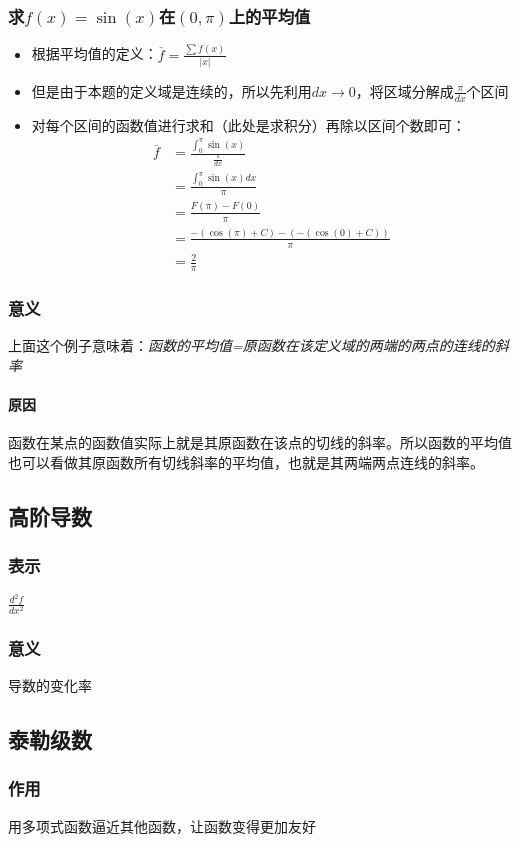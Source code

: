 \documentclass[UTF8]{ctexart}
\begin{document}
\subsubsection{求$f(x) = \sin(x)$在$(0,\pi)$上的平均值}
\begin{itemize}
	\item 根据平均值的定义：$\overline{f} = \frac{\sum f(x)}{|x|}$
	\item 但是由于本题的定义域是连续的，所以先利用$dx\to0$，将区域分解成$\frac{\pi}{dx}$个区间
	\item 对每个区间的函数值进行求和（此处是求积分）再除以区间个数即可：\begin{align*}
		\overline{f} &= \frac{\int_0^{\pi} \sin(x)}{\frac{\pi}{dx}} \\
		&= \frac{\int_0^{\pi} \sin(x)dx}{\pi} \\
		&= \frac{F(\pi) - F(0)}{\pi} \\
		&= \frac{-(\cos(\pi)+C)-(-(\cos(0)+C))}{\pi} \\
		&= \frac{2}{\pi}
	\end{align*}
\end{itemize}
\subsubsection{意义}
上面这个例子意味着：\emph{函数的平均值=原函数在该定义域的两端的两点的连线的斜率}
\paragraph{原因}
函数在某点的函数值实际上就是其原函数在该点的切线的斜率。所以函数的平均值也可以看做其原函数所有切线斜率的平均值，也就是其两端两点连线的斜率。

\subsection{高阶导数}
\subsubsection{表示} $\frac{d^2f}{dx^2}$
\subsubsection{意义} 导数的变化率

\subsection{泰勒级数}
\subsubsection{作用}
用多项式函数逼近其他函数，让函数变得更加友好
\end{document}
